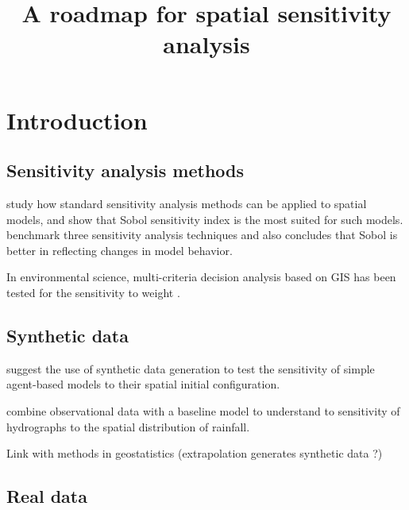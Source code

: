


\title{A roadmap for spatial sensitivity analysis}
\author{}
\date{}


\maketitle

\justify


\begin{abstract}

\end{abstract}





\section{Introduction}


\subsection{Sensitivity analysis methods}

\cite{lilburne2009sensitivity} study how standard sensitivity analysis methods can be applied to spatial models, and show that Sobol sensitivity index is the most suited for such models. \cite{saint2010comparison} benchmark three sensitivity analysis techniques and also concludes that Sobol is better in reflecting changes in model behavior.

In environmental science, multi-criteria decision analysis based on GIS has been tested for the sensitivity to weight \cite{chen2010spatial}.



\subsection{Synthetic data}

\cite{cottineau2017initial} suggest the use of synthetic data generation to test the sensitivity of simple agent-based models to their spatial initial configuration.

\cite{obled1994sensitivity} combine observational data with a baseline model to understand to sensitivity of hydrographs to the spatial distribution of rainfall.

Link with methods in geostatistics \cite{gotway2002combining} (extrapolation generates synthetic data ?)


\subsection{Real data}


